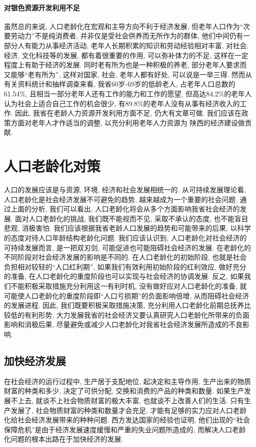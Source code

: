 \documentclass[a4paper, 12pt, UTF8]{article}
\begin{document}
\paragraph{对银色资源开发利用不足}
虽然总的来说, 人口老龄化在宏观和主导方向不利于经济发展, 但老年人口作为``次要劳动力''不是纯消费者, 并非仅是受社会供养而无所作为的群体, 他们中间仍有一部分人有能力从事经济活动, 老年人长期积累的知识和劳动经验相对丰富, 对社会, 经济, 文化科技等的发展, 都有着很重要的作用, 可以弥补体力的不足, 这样在一定程度上有助于经济的发展. 同时老有所为也是一种积极的养老, 部分老年人要求而又能够“老有所为”, 这样对国家, 社会, 老年人都有好处, 可以说是一举三得. 然而从有关资料统计和抽样调查来看, 我省60岁-69岁的低龄老人, 占老年人口总数的61.54\%, 且相当一部分老年人还有工作的能力和工作的愿望, 但高达84.2\%的老年人认为社会上适合自己工作的机会很少, 有89.8\%的老年人没有从事有经济收入的工作. 因此, 我省在老龄人力资源开发利用方面不足, 仍大有文章可做. 我们应该在政策方面对老年人才作适当的调整, 以充分利用老年人力资源为
陕西的经济建设做贡献. 

\section{人口老龄化对策}
人口的发展应该是与资源, 环境, 经济和社会发展相统一的. 从可持续发展理论看, 人口老龄化是社会经济发展不可避免的趋势, 越来越成为一个重要的社会问题. 通过上面的分析, 我们可以看出, 人口老龄化将会从多个方面影响我省社会经济的发展. 面对人口老龄化的挑战, 我们既不能视而不见, 采取不承认的态度, 也不能盲目悲观, 消极害怕. 我们应该根据我省老龄人口发展的趋势和可能带来的后果, 以科学的态度对待人口年龄结构老龄化问题. 我们应该认识到, 人口老龄化对社会经济的可持续发展而言, 是一把双刃剑, 可能促进也可能阻碍社会经济的发展. 在老龄化的不同阶段对社会经济发展的影响是不同的. 在人口老龄化的初始阶段, 也就是社会负担相对较轻的“人口红利期”, 如果我们有效利用初始阶段的红利效应, 做好充分的准备, 在人口老龄化的重度阶段也可以实现与社会经济的协调发展. 反之, 如果我们不能积极采取措施充分利用这一有利时机, 没有做好应对人口老龄化的准备, 就可能使人口老龄化的重度阶段即“人口亏损期”的负面影响倍增, 从而阻碍社会经济的发展进程. 因此, 我们既要积极采取措施决策, 充分利用人口老龄化前期总抚养比较低的有利形势, 大力发展我省的社会经济又要认真研究人口老龄化所带来的负面影响和消极后果, 尽量避免或减少人口老龄化对我省社会经济发展所造成的不良影响.

\subsection{加快经济发展}
在社会经济的运行过程中, 生产居于支配地位, 起决定和主导作用, 生产出来的物质财富的种类和多少, 决定了可供分配, 交换和消费的产品的种类和数量. 如果生产发展不上去, 就谈不上社会物质财富的极大丰富, 也就谈不上改善人们的生活. 只有生产发展了, 社会物质财富的种类和数量才会充足, 才能有足够的实力应对人口老龄化给社会经济发展带来的种种问题. 西方发达国家的经验也证明, 他们出现的``社会保障危机''是由于经济发展速度缓慢和严重的失业问题所造成的, 而解决人口老龄化问题的根本出路在于加快经济的发展. 
\end{document}
